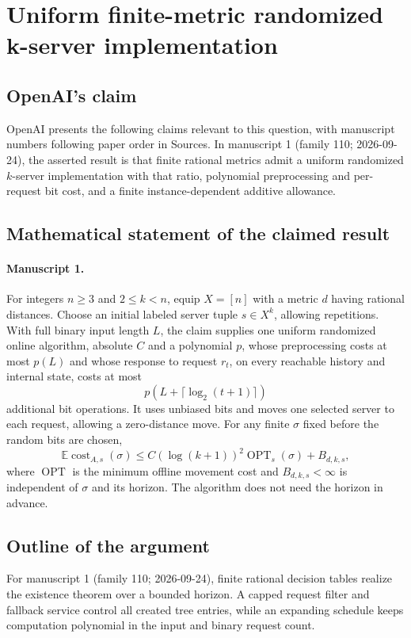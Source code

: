 \documentclass[11pt]{article}
\begin{document}
\section*{Uniform finite-metric randomized k-server implementation}

\subsection{OpenAI's claim}
OpenAI presents the following claims relevant to this question, with manuscript numbers following paper order in Sources. In manuscript 1 (family 110; 2026-09-24), the asserted result is that finite rational metrics admit a uniform randomized $k$-server implementation with that ratio, polynomial preprocessing and per-request bit cost, and a finite instance-dependent additive allowance.

\subsection{Mathematical statement of the claimed result}
\paragraph{Manuscript 1.}
For integers $n\ge3$ and $2\le k<n$, equip $X=[n]$ with a metric $d$ having rational distances. Choose an initial labeled server tuple $s\in X^k$, allowing repetitions. With full binary input length $L$, the claim supplies one uniform randomized online algorithm, absolute $C$ and a polynomial $p$, whose preprocessing costs at most $p(L)$ and whose response to request $r_t$, on every reachable history and internal state, costs at most
\[
 p(L+\lceil\log_2(t+1)\rceil)
\]
additional bit operations. It uses unbiased bits and moves one selected server to each request, allowing a zero-distance move. For any finite $\sigma$ fixed before the random bits are chosen,
\[
 \mathbb E\operatorname{cost}_{A,s}(\sigma)
 \le C(\log(k+1))^2\operatorname{OPT}_s(\sigma)+B_{d,k,s},
\]
where $\operatorname{OPT}$ is the minimum offline movement cost and $B_{d,k,s}<\infty$ is independent of $\sigma$ and its horizon. The algorithm does not need the horizon in advance.

\subsection{Outline of the argument}
For manuscript 1 (family 110; 2026-09-24), finite rational decision tables realize the existence theorem over a bounded horizon. A capped request filter and fallback service control all created tree entries, while an expanding schedule keeps computation polynomial in the input and binary request count.
\end{document}
